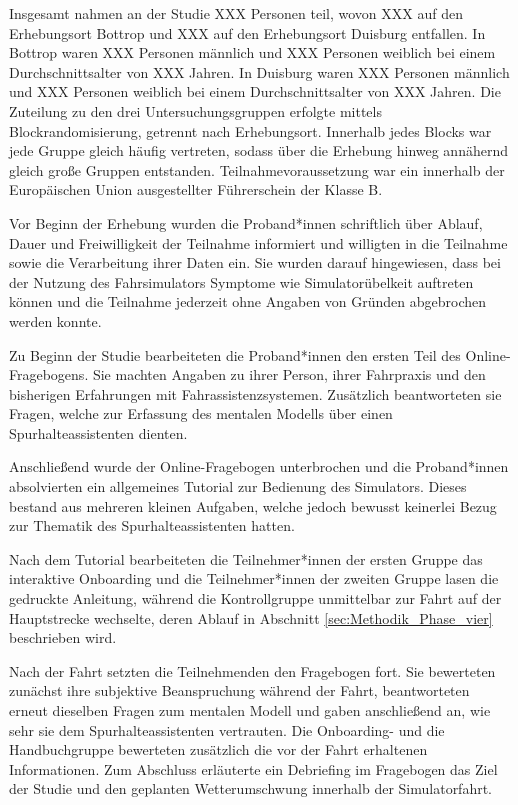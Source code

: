 Insgesamt nahmen an der Studie XXX Personen teil, wovon XXX auf den Erhebungsort Bottrop und XXX auf den Erhebungsort Duisburg entfallen. In Bottrop waren XXX Personen männlich und XXX Personen weiblich bei einem Durchschnittsalter von XXX Jahren. In Duisburg waren XXX Personen männlich und XXX Personen weiblich bei einem Durchschnittsalter von XXX Jahren. Die Zuteilung zu den drei Untersuchungsgruppen erfolgte mittels Blockrandomisierung, getrennt nach Erhebungsort. Innerhalb jedes Blocks war jede Gruppe gleich häufig vertreten, sodass über die Erhebung hinweg annähernd gleich große Gruppen entstanden. Teilnahmevoraussetzung war ein innerhalb der Europäischen Union ausgestellter Führerschein der Klasse B.

Vor Beginn der Erhebung wurden die Proband*innen schriftlich über Ablauf, Dauer und Freiwilligkeit der Teilnahme informiert und willigten in die Teilnahme sowie die Verarbeitung ihrer Daten ein. Sie wurden darauf hingewiesen, dass bei der Nutzung des Fahrsimulators Symptome wie Simulatorübelkeit auftreten können und die Teilnahme jederzeit ohne Angaben von Gründen abgebrochen werden konnte.

Zu Beginn der Studie bearbeiteten die Proband*innen den ersten Teil des Online-Fragebogens. Sie machten Angaben zu ihrer Person, ihrer Fahrpraxis und den bisherigen Erfahrungen mit Fahrassistenzsystemen. Zusätzlich beantworteten sie Fragen, welche zur Erfassung des mentalen Modells über einen Spurhalteassistenten dienten. 

Anschließend wurde der Online-Fragebogen unterbrochen und die Proband*innen absolvierten ein allgemeines Tutorial zur Bedienung des Simulators. Dieses bestand aus mehreren kleinen Aufgaben, welche jedoch bewusst keinerlei Bezug zur Thematik des Spurhalteassistenten hatten. 

Nach dem Tutorial bearbeiteten die Teilnehmer*innen der ersten Gruppe das interaktive Onboarding und die Teilnehmer*innen der zweiten Gruppe lasen die gedruckte Anleitung, während die Kontrollgruppe unmittelbar zur Fahrt auf der Hauptstrecke wechselte, deren Ablauf in Abschnitt \ref{sec:Methodik_Phase_vier} beschrieben wird.

Nach der Fahrt setzten die Teilnehmenden den Fragebogen fort. Sie bewerteten zunächst ihre subjektive Beanspruchung während der Fahrt, beantworteten erneut dieselben Fragen zum mentalen Modell und gaben anschließend an, wie sehr sie dem Spurhalteassistenten vertrauten. Die Onboarding- und die Handbuchgruppe bewerteten zusätzlich die vor der Fahrt erhaltenen Informationen. Zum Abschluss erläuterte ein Debriefing im Fragebogen das Ziel der Studie und den geplanten Wetterumschwung innerhalb der Simulatorfahrt.

